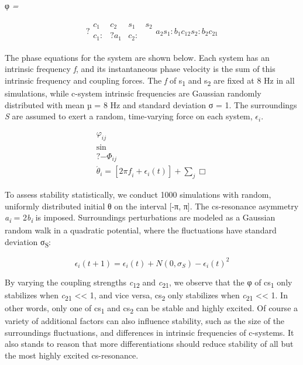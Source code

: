 φ \textit{=} 

\begin{equation*}
\begin{matrix}?\begin{matrix}{c}_{1} & {c}_{2} & {s}_{1} & {s}_{2}\\
{c}_{1}: & ?{a}_{1} & {c}_{2}:\end{matrix}{a}_{2}{s}_{1}:{b}_{1}{c}_{12}{s}_{2}:{b}_{2}{c}_{21}\end{matrix}
\end{equation*}

  The phase equations for the system are shown below. Each system has an intrinsic frequency \textit{f}, and its instantaneous phase velocity is the sum of this intrinsic frequency and coupling forces. The \textit{f} of s\textsubscript{1} and s\textsubscript{2} are fixed at 8 Hz in all simulations, while c-system intrinsic frequencies are Gaussian randomly distributed with mean µ = 8 Hz and standard deviation σ = 1. The surroundings \textit{S} are assumed to exert a random, time-varying force on each system,  ${\epsilon} _{i}$. 

\begin{equation*}
\begin{matrix}{\varphi} _{\mathit{ij}}\\
\sin \\
?{-\Phi} _{\mathit{ij}}\\
{\acute{{\theta} }}_{i}=\left[{2\mathit{\pi f}}_{i}+{\epsilon} _{i}\left(t\right)\right]+\sum _{j}\Box \end{matrix}
\end{equation*}

  To assess stability statistically, we conduct 1000 simulations with random, uniformly distributed initial θ on the interval [-π, π]. The cs-resonance asymmetry \textit{a\textsubscript{i}} = 2\textit{b\textsubscript{i}} is imposed. Surroundings perturbations are modeled as a Gaussian random walk in a quadratic potential, where the fluctuations have standard deviation σ\textsubscript{S}:

\begin{equation*}
{\epsilon} _{i}\left(t+1\right)={\epsilon} _{i}\left(t\right)+N\left(0,{\sigma} _{S}\right)-{{\epsilon} _{i}\left(t\right)}^{2}
\end{equation*}

  By varying the coupling strengths \textit{c}\textsubscript{12} and \textit{c}\textsubscript{21},  we observe that the φ of cs\textsubscript{1} only stabilizes when \textit{c}\textsubscript{21} << 1, and vice versa, cs\textsubscript{2} only stabilizes when \textit{c}\textsubscript{21} << 1. In other words, only one of cs\textsubscript{1} and cs\textsubscript{2} can be stable and highly excited. Of course a variety of additional factors can also influence stability, such as the size of the surroundings fluctuations, and differences in intrinsic frequencies of c-systems. It also stands to reason that more differentiations should reduce stability of all but the most highly excited cs-resonance.

